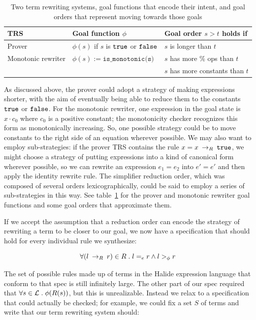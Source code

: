 \begin{table}[]
    \centering
    \begin{tabular}{|l|l|l|}
    \hline 
        TRS & Goal function $\phi$ & Goal order $s > t$ holds if \\
        \hline 
        Prover &  $\phi(s)$ if $s$ is $\texttt{true}$ or $\texttt{false}$ & $s$ is longer than $t$\\
        \hline
        Monotonic rewriter & $\phi(s) := \texttt{is_monotonic(s)}$ & $s$ has more $\%$ ops than $t$\\
                 & & $s$ has more constants than $t$\\
        \hline
    \end{tabular}
    \caption{Two term rewriting systems, goal functions that encode their intent, and goal orders that represent moving towards those goals}
    \label{tab:trsspecs}
\end{table}

As discussed above, the prover could adopt a strategy of making expressions shorter, with the aim of eventually being able to reduce them to the constants $\texttt{true}$ or $\texttt{false}$. For the monotonic rewriter, one expression in the goal state is $x \cdot c_0$ where $c_0$ is a positive constant; the monotonicity checker recognizes this form as monotonically increasing. So, one possible strategy could be to move constants to the right side of an equation wherever possible. We may also want to employ sub-strategies: if the prover TRS contains the rule $x = x \:\rightarrow_{R}\: \texttt{true}$, we might choose a strategy of putting expressions into a kind of canonical form wherever possible, so we can rewrite an expression $e_1 = e_2$ into $e' = e'$ and then apply the identity rewrite rule. The simplifier reduction order, which was composed of several orders lexicographically, could be said to employ a series of sub-strategies in this way. See table~\ref{tab:trsspecs} for the prover and monotonic rewriter goal functions and some goal orders that approximate them.

If we accept the assumption that a reduction order can encode the strategy of rewriting a term to be closer to our goal, we now have a specification that should hold for every individual rule we synthesize:

\[ \forall (l \:\rightarrow_{R}\: r) \in R \;.\; l =_e r \wedge l >_{\phi} r
\]

The set of possible rules made up of terms in the Halide expression language that conform to that spec is still infinitely large. The other part of our spec required that $\forall s \in \mathcal{L} \;.\; \phi(R(s))$, but this is unrealizable. Instead we relax to a specification that could actually be checked; for example, we could fix a set $S$ of terms and write that our term rewriting system should:

